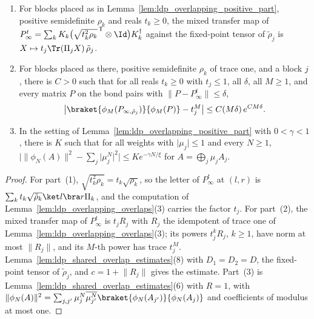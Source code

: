 \begin{lemma}
    \label{lem:ldp_overlapping_overlaps_weights}
    \leanok
    \begin{enumerate}
        \item For blocks placed as in Lemma~\ref{lem:ldp_overlapping_positive_part},
              positive semidefinite $\rho_k$ and reals $t_k\geq0$, the mixed transfer map
              of $P_\infty^{t}=\sum_kK_k\bigl(\sqrt{t_k^2\rho_k}^{\,\mathsf T}\otimes\Id\bigr)
                  K_k^\dagger$ against the fixed-point tensor of $\tilde\rho_j$ is
              $X\mapsto t_j\Tr(\Pi_jX)\,\tilde\rho_j$.
        \item For blocks placed as there, positive semidefinite $\rho_k$ of trace one, and
              a block $j$, there is $C>0$ such that for all reals $t_k\geq0$ with
              $t_j\leq1$, all $\delta$, all $M\geq1$, and every matrix $P$ on the bond
              pairs with $\lVert P-P_\infty^{t}\rVert\leq\delta$,
              \begin{align*}
                  \bigl\lvert\braket{\phi_M(P_{\infty,\tilde\rho_j})}{\phi_M(P)}-t_j^M\bigr\rvert
                  \leq C(M\delta)\,e^{CM\delta}.
              \end{align*}
        \item In the setting of Lemma~\ref{lem:ldp_overlapping_positive_part} with
              $0<\gamma<1$, there is $K$ such that for all weights with
              $\lvert\mu_j\rvert\leq1$ and every $N\geq1$,
              $\bigl\lvert\lVert\phi_N(A)\rVert^2-\sum_j\lvert\mu_j^N\rvert^2\bigr\rvert
                  \leq Ke^{-\gamma N/\xi}$ for $A=\bigoplus_j\mu_jA_j$.
    \end{enumerate}
\end{lemma}
\begin{proof}
    \leanok
    For part~(1), $\sqrt{t_k^2\rho_k}=t_k\sqrt{\rho_k}$, so the letter of
    $P_\infty^{t}$ at $(l,r)$ is $\sum_kt_k\sqrt{\tilde\rho_k}\ket l\bra r\Pi_k$, and the
    computation of Lemma~\ref{lem:ldp_overlapping_overlaps}(3) carries the factor $t_j$.
    For part~(2), the mixed transfer map of $P_\infty^{t}$ is $t_jR_j$ with $R_j$ the
    idempotent of trace one of Lemma~\ref{lem:ldp_overlapping_overlaps}(3); its powers
    $t_j^kR_j$, $k\geq1$, have norm at most $\lVert R_j\rVert$, and its $M$-th power has
    trace $t_j^M$. Lemma~\ref{lem:ldp_shared_overlap_estimates}(8) with $D_1=D_2=D$, the
    fixed-point tensor of $\tilde\rho_j$, and $c=1+\lVert R_j\rVert$ gives the estimate.
    Part~(3) is Lemma~\ref{lem:ldp_shared_overlap_estimates}(6) with $R=1$, with
    $\lVert\phi_N(A)\rVert^2=\sum_{j,j'}\mu_j^N\overline{\mu_{j'}^N}
        \braket{\phi_N(A_{j'})}{\phi_N(A_j)}$ and coefficients of modulus at most one.
\end{proof}

